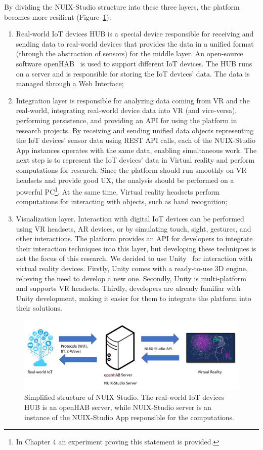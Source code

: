 By dividing the NUIX-Studio structure into these three layers, the platform becomes more resilient (Figure~\ref{fig:BasicPlatformStructure-figure}): 
\begin{enumerate}
    \item Real-world IoT devices HUB is a special device responsible for receiving and sending data to real-world devices that provides the data in a unified format (through the abstraction of sensors) for the middle layer. An open-source software openHAB~\cite{OpenHab} is used to support different IoT devices. The HUB runs on a server and is responsible for storing the IoT devices' data. The data is managed through a Web Interface;
    \item Integration layer is responsible for analyzing data coming from VR and the real-world, integrating real-world device data into VR (and vice-versa), performing persistence, and providing an API for using the platform in research projects. By receiving and sending unified data objects representing the IoT devices' sensor data using REST API calls, each of the NUIX-Studio App instances operates with the same data, enabling simultaneous work. The next step is to represent the IoT devices' data in Virtual reality and perform computations for research. Since the platform should run smoothly on VR headsets and provide good UX, the analysis should be performed on a powerful PC\footnote{In Chapter 4 an experiment proving this statement is provided.}. At the same time, Virtual reality headsets perform computations for interacting with objects, such as hand recognition;
    \item Visualization layer. Interaction with digital IoT devices can be performed using VR headsets, AR devices, or by simulating touch, sight, gestures, and other interactions. The platform provides an API for developers to integrate their interaction techniques into this layer, but developing these techniques is not the focus of this research. We decided to use Unity~\cite{Unity} for interaction with virtual reality devices. Firstly, Unity comes with a ready-to-use 3D engine, relieving the need to develop a new one. Secondly, Unity is multi-platform and supports VR headsets. Thirdly, developers are already familiar with Unity development, making it easier for them to integrate the platform into their solutions.
\end{enumerate}

\begin{figure}
  \centering
  \includegraphics[width=0.9\linewidth]{figures/BasicPlatformStructure.png}
  \caption{Simplified structure of NUIX Studio. The real-world IoT devices HUB is an openHAB server, while NUIX-Studio server is an instance of the NUIX-Studio App responsible for the computations.}
  \label{fig:BasicPlatformStructure-figure}
\end{figure}

